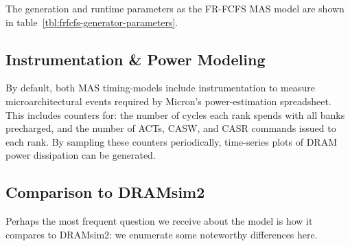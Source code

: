 The generation and runtime parameters as the FR-FCFS MAS model are shown
in table~\ref{tbl:frfcfs-generator-parameters}.

\begin{table}[htb]
\begin{center}
\end{center}
\caption{Generation parameters of the FR-FCFS MAS model.}
\label{tbl:frfcfs-generator-parameters}
\end{table}%

\subsection{Instrumentation \& Power Modeling}

By default, both MAS timing-models include instrumentation to measure
microarchitectural events required by Micron's power-estimation spreadsheet.
This includes counters for: the number of cycles each rank spends with all
banks precharged, and the number of ACTs, CASW, and CASR commands issued to
each rank. By sampling these counters periodically, time-series plots of DRAM
power dissipation can be generated.

\subsection{Comparison to DRAMsim2}

Perhaps the most frequent question we receive about the model is how it
compares to DRAMsim2: we enumerate some noteworthy differences here.

